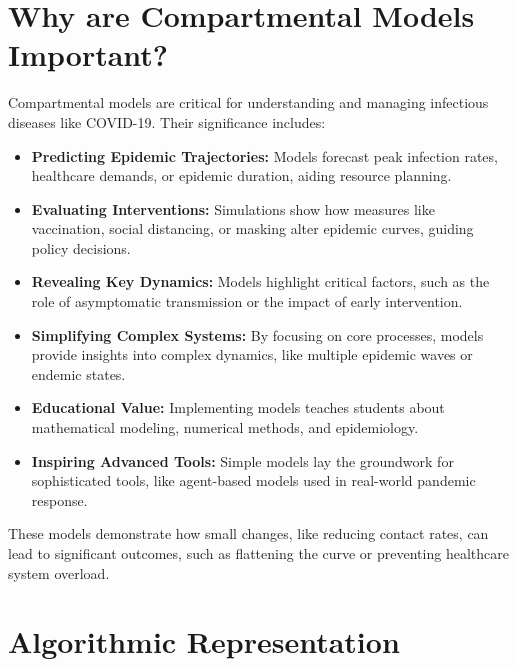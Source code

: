 \documentclass{article}
\begin{document}
\section{Why are Compartmental Models Important?}

Compartmental models are critical for understanding and managing infectious diseases like COVID-19. Their significance includes:
\begin{itemize}
    \item \textbf{Predicting Epidemic Trajectories:} Models forecast peak infection rates, healthcare demands, or epidemic duration, aiding resource planning.
    \item \textbf{Evaluating Interventions:} Simulations show how measures like vaccination, social distancing, or masking alter epidemic curves, guiding policy decisions.
    \item \textbf{Revealing Key Dynamics:} Models highlight critical factors, such as the role of asymptomatic transmission or the impact of early intervention.
    \item \textbf{Simplifying Complex Systems:} By focusing on core processes, models provide insights into complex dynamics, like multiple epidemic waves or endemic states.
    \item \textbf{Educational Value:} Implementing models teaches students about mathematical modeling, numerical methods, and epidemiology.
    \item \textbf{Inspiring Advanced Tools:} Simple models lay the groundwork for sophisticated tools, like agent-based models used in real-world pandemic response.
\end{itemize}

These models demonstrate how small changes, like reducing contact rates, can lead to significant outcomes, such as flattening the curve or preventing healthcare system overload.

\section{Algorithmic Representation}
\end{document}

